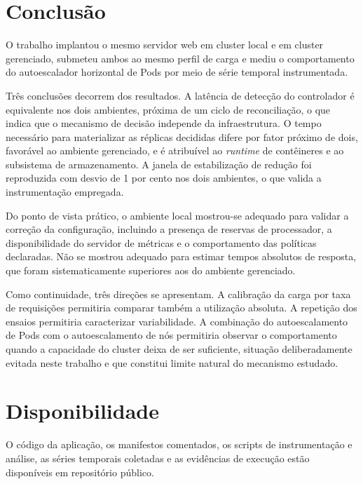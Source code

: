 \documentclass[12pt]{article}
\begin{document}
\section{Conclusão}

O trabalho implantou o mesmo servidor web em cluster local e em cluster
gerenciado, submeteu ambos ao mesmo perfil de carga e mediu o comportamento do
autoescalador horizontal de Pods por meio de série temporal instrumentada.

Três conclusões decorrem dos resultados. A latência de detecção do controlador é
equivalente nos dois ambientes, próxima de um ciclo de reconciliação, o que
indica que o mecanismo de decisão independe da infraestrutura. O tempo
necessário para materializar as réplicas decididas difere por fator próximo de
dois, favorável ao ambiente gerenciado, e é atribuível ao \emph{runtime} de
contêineres e ao subsistema de armazenamento. A janela de estabilização de
redução foi reproduzida com desvio de 1 por cento nos dois ambientes, o que
valida a instrumentação empregada.

Do ponto de vista prático, o ambiente local mostrou-se adequado para validar a
correção da configuração, incluindo a presença de reservas de processador, a
disponibilidade do servidor de métricas e o comportamento das políticas
declaradas. Não se mostrou adequado para estimar tempos absolutos de resposta,
que foram sistematicamente superiores aos do ambiente gerenciado.

Como continuidade, três direções se apresentam. A calibração da carga por taxa
de requisições permitiria comparar também a utilização absoluta. A repetição dos
ensaios permitiria caracterizar variabilidade. A combinação do autoescalamento
de Pods com o autoescalamento de nós permitiria observar o comportamento quando
a capacidade do cluster deixa de ser suficiente, situação deliberadamente
evitada neste trabalho e que constitui limite natural do mecanismo estudado.

\section*{Disponibilidade}

O código da aplicação, os manifestos comentados, os scripts de instrumentação e
análise, as séries temporais coletadas e as evidências de execução estão
disponíveis em repositório público.
\end{document}
